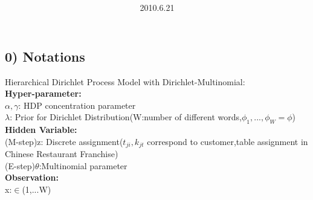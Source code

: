 \documentclass{article}
\title{\vspace{0.3in}\textmd{\textbf{\hmwkTitle}}}
\date{2010.6.21}
\author{\textbf{\hmwkAuthorName}}
\begin{document}
\begin{spacing}{1.1}
\maketitle


\section{0) Notations }
Hierarchical Dirichlet Process Model with Dirichlet-Multinomial:\\ 
{\bf Hyper-parameter:}\\
$\alpha,\gamma$: HDP concentration parameter\\
$\lambda$: Prior for Dirichlet Distribution(W:number of different words,$\phi_{1},...,\phi_{W}=\phi$)\\
{\bf Hidden Variable:}\\
(M-step)z: Discrete assignment($t_{ji},k_{jt}$ correspond to customer,table assignment in Chinese Restaurant Franchise)\\
(E-step)$\theta$:Multinomial parameter\\
{\bf Observation:}\\
x:$\in$(1,...W)

\end{spacing}
\end{document}
